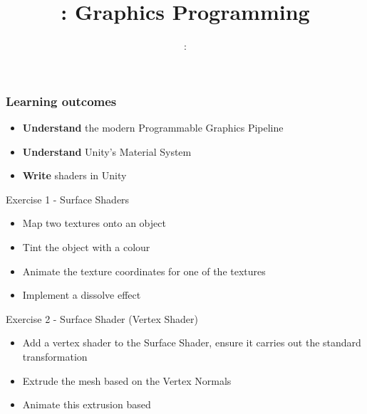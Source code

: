 \usepackage{../../beamerthemeFalmouthGamesAcademy}
\usepackage{multimedia}
\graphicspath{ {../../} }

\usepackage[normalem]{ulem}
\usepackage{wasysym}

\usepackage{pdfpages}



\usetikzlibrary{arrows,automata}




\title{\sessionnumber: Graphics Programming}
\subtitle{\modulecode: \moduletitle}

\frame{\titlepage} 

\begin{frame}
	\frametitle{Learning outcomes}
	\begin{itemize}
		\item \textbf{Understand} the modern Programmable Graphics Pipeline
		\item \textbf{Understand} Unity's Material System
		\item \textbf{Write} shaders in Unity
	\end{itemize}
\end{frame}





\begin{frame}{Exercise 1 - Surface Shaders}
	\begin{itemize}
		\item Map two textures onto an object
		\item Tint the object with a colour
		\item Animate the texture coordinates for one of the textures
		\item Implement a dissolve effect
	\end{itemize}
\end{frame}

\begin{frame}{Exercise 2 - Surface Shader (Vertex Shader)}
	\begin{itemize}
		\item Add a vertex shader to the Surface Shader, ensure it carries out the standard transformation
		\item Extrude the mesh based on the Vertex Normals
		\item Animate this extrusion based
	\end{itemize}
\end{frame}


